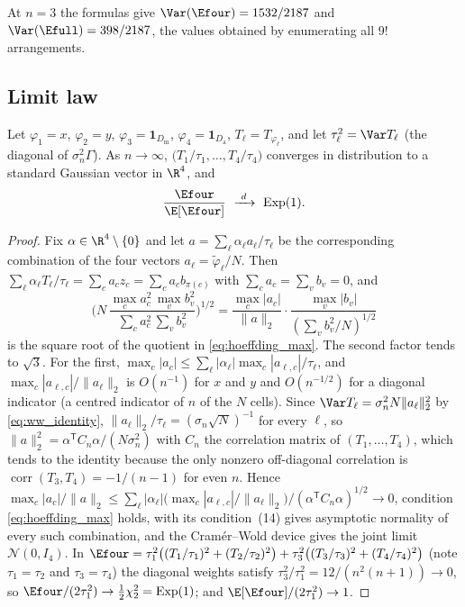At $n=3$ the formulas give $\Var(\Efour)=1532/2187$ and $\Var(\Efull)=398/2187$, the values obtained by enumerating all $9!$ arrangements.

\subsection{Limit law}

\begin{corollary}
\label{cor:random_energy_clt}
Let $\varphi_1=x$, $\varphi_2=y$, $\varphi_3=\mathbf 1_{D_{\mathrm m}}$, $\varphi_4=\mathbf 1_{D_{\mathrm a}}$, $T_\ell=T_{\varphi_\ell}$, and let $\tau_\ell^2=\Var T_\ell$ (the diagonal of $\sigma_n^2\Gamma$).
As $n\to\infty$, $\bigl(T_1/\tau_1,\dots,T_4/\tau_4\bigr)$ converges in distribution to a standard Gaussian vector in $\R^4$, and
\begin{equation}
\frac{\Efour}{\E[\Efour]}\ \xrightarrow{\ d\ }\ \mathrm{Exp}(1).
\label{eq:low_limit}
\end{equation}
\end{corollary}

\begin{proof}
Fix $\alpha\in\R^4\setminus\{0\}$ and let $a=\sum_\ell\alpha_\ell a_\ell/\tau_\ell$ be the corresponding combination of the four vectors $a_\ell=\tilde\varphi_\ell/N$.
Then $\sum_\ell\alpha_\ell T_\ell/\tau_\ell=\sum_ca_cz_c=\sum_ca_cb_{\pi(c)}$ with $\sum_ca_c=\sum_vb_v=0$, and
\[
\biggl(N\,\frac{\max_ca_c^2\,\max_vb_v^2}{\sum_ca_c^2\,\sum_vb_v^2}\biggr)^{1/2}=\frac{\max_c|a_c|}{\|a\|_2}\cdot\frac{\max_v|b_v|}{(\sum_vb_v^2/N)^{1/2}}
\]
is the square root of the quotient in \eqref{eq:hoeffding_max}.
The second factor tends to $\sqrt3$.
For the first, $\max_c|a_c|\le\sum_\ell|\alpha_\ell|\max_c|a_{\ell,c}|/\tau_\ell$, and $\max_c|a_{\ell,c}|/\|a_\ell\|_2$ is $O(n^{-1})$ for $x$ and $y$ and $O(n^{-1/2})$ for a diagonal indicator (a centred indicator of $n$ of the $N$ cells).
Since $\Var T_\ell=\sigma_n^2N\|a_\ell\|_2^2$ by \eqref{eq:ww_identity}, $\|a_\ell\|_2/\tau_\ell=(\sigma_n\sqrt N)^{-1}$ for every $\ell$, so $\|a\|_2^2=\alpha^{\mathsf T}C_n\alpha/(N\sigma_n^2)$ with $C_n$ the correlation matrix of $(T_1,\dots,T_4)$, which tends to the identity because the only nonzero off-diagonal correlation is $\operatorname{corr}(T_3,T_4)=-1/(n-1)$ for even $n$.
Hence $\max_c|a_c|/\|a\|_2\le\sum_\ell|\alpha_\ell|\bigl(\max_c|a_{\ell,c}|/\|a_\ell\|_2\bigr)/(\alpha^{\mathsf T}C_n\alpha)^{1/2}\to0$, condition \eqref{eq:hoeffding_max} holds, \cite[Thm.~4]{hoeffding1951} with its condition~(14) gives asymptotic normality of every such combination, and the Cram\'er--Wold device gives the joint limit $\mathcal N(0,I_4)$.
In $\Efour=\tau_1^2\bigl((T_1/\tau_1)^2+(T_2/\tau_2)^2\bigr)+\tau_3^2\bigl((T_3/\tau_3)^2+(T_4/\tau_4)^2\bigr)$ (note $\tau_1=\tau_2$ and $\tau_3=\tau_4$) the diagonal weights satisfy $\tau_3^2/\tau_1^2=12/(n^2(n+1))\to0$, so $\Efour/(2\tau_1^2)\to\frac12\chi^2_2=\mathrm{Exp}(1)$; and $\E[\Efour]/(2\tau_1^2)\to1$.
\end{proof}

